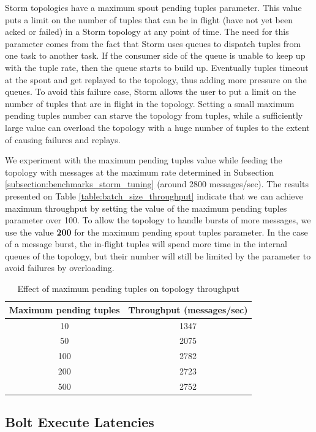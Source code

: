 Storm topologies have a maximum spout pending tuples parameter. This value puts a limit on the number of tuples that can be in flight (have not yet been acked or failed) in a Storm topology at any point of time. The need for this parameter comes from the fact that Storm uses queues to dispatch tuples from one task to another task. If the consumer side of the queue is unable to keep up with the tuple rate, then the queue starts to build up. Eventually tuples timeout at the spout and get replayed to the topology, thus adding more pressure on the queues. To avoid this failure case, Storm allows the user to put a limit on the number of tuples that are in flight in the topology. Setting a small maximum pending tuples number can starve the topology from tuples, while a sufficiently large value can overload the topology with a huge number of tuples to the extent of causing failures and replays. 

We experiment with the maximum pending tuples value while feeding the topology with messages at the maximum rate determined in Subsection \ref{subsection:benchmarks_storm_tuning} (around 2800 messages/sec). The results presented on Table \ref{table:batch_size_throughput} indicate that we can achieve maximum throughput by setting the value of the maximum pending tuples parameter over 100. To allow the topology to handle bursts of more messages, we use the value \textbf{200} for the maximum pending spout tuples parameter. In the case of a message burst, the in-flight tuples will spend more time in the internal queues of the topology, but their number will still be limited by the parameter to avoid failures by overloading.

\begin{table}[H]
\centering
\begin{tabular}{ |c|c| }
\hline
Maximum pending tuples & Throughput (messages/sec) \\ \hline \hline
10 & 1347 \\ \hline
50 & 2075 \\ \hline
100 & 2782 \\ \hline
200 & 2723 \\ \hline
500 & 2752 \\ \hline
\end{tabular}
\caption{Effect of maximum pending tuples on topology throughput}
\label{table:max_pending_tuples}
\end{table}

\subsection{Bolt Execute Latencies}

